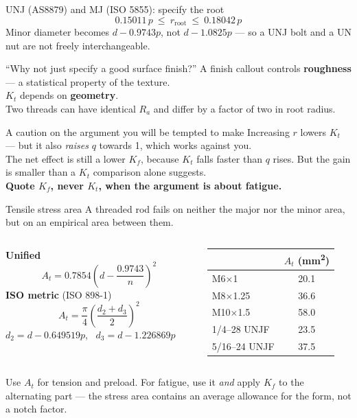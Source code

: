\documentclass[aspectratio=169,10pt]{beamer}
\begin{document}
\begin{frame}{UNJ (AS8879) and MJ (ISO 5855): specify the root}
\centering
\resizebox{0.82\textwidth}{!}{}
\vfill
\[\boxed{\ 0.15011\,p \ \le\ r_{\text{root}} \ \le\ 0.18042\,p\ }\]
\vfill
{\small Minor diameter becomes $d-0.9743p$, not $d-1.0825p$ --- so
\alert{a UNJ bolt and a UN nut are not freely interchangeable}.}
\end{frame}

\begin{frame}{``Why not just specify a good surface finish?''}
A finish callout controls \textbf{roughness} --- a statistical property of the texture.\\[6pt]
$K_t$ depends on \textbf{geometry}.\\[6pt]
Two threads can have identical $R_a$ and differ by a factor of two in root radius.
\vfill
\begin{alertblock}{A caution on the argument you will be tempted to make}
Increasing $r$ lowers $K_t$ --- but it also \emph{raises} $q$ towards 1, which works against you.\\[5pt]
The net effect is still a lower $K_f$, because $K_t$ falls faster than $q$ rises. But the gain is
smaller than a $K_t$ comparison alone suggests.\\[5pt]
\textbf{Quote $K_f$, never $K_t$, when the argument is about fatigue.}
\end{alertblock}
\end{frame}

\begin{frame}{Tensile stress area}
A threaded rod fails on neither the major nor the minor area, but on an empirical area between them.
\begin{columns}[T]
\begin{column}{0.5\textwidth}
\textbf{Unified}
\[ A_t = 0.7854\left(d - \frac{0.9743}{n}\right)^{2} \]
\textbf{ISO metric} (ISO 898-1)
\[ A_t = \frac{\pi}{4}\left(\frac{d_2+d_3}{2}\right)^{2} \]
{\footnotesize $d_2 = d-0.649519p$, \ $d_3 = d-1.226869p$}
\end{column}
\begin{column}{0.46\textwidth}
\centering\small
\begin{tabular}{@{}lS[table-format=2.1]@{}}
\toprule
 & {$A_t$ (\si{mm^2})}\\
\midrule
M6$\times$1 & 20.1\\
M8$\times$1.25 & 36.6\\
M10$\times$1.5 & 58.0\\
1/4--28 UNJF & 23.5\\
5/16--24 UNJF & 37.5\\
\bottomrule
\end{tabular}
\end{column}
\end{columns}
\vfill
{\small Use $A_t$ for tension and preload. For fatigue, use it \emph{and} apply $K_f$ to the
alternating part --- the stress area contains an average allowance for the form, not a notch factor.}
\end{frame}
\end{document}

